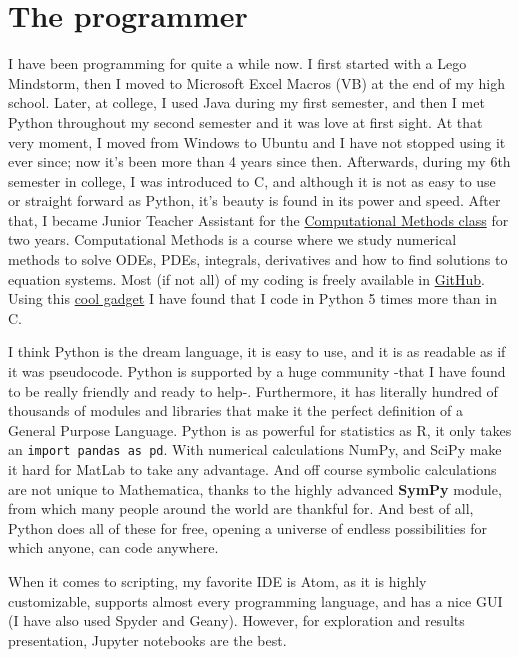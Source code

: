 \documentclass[12pt]{article}
\newcommand{\sympy}{\textbf{SymPy}}
\begin{document}
\section{The programmer}
I have been programming for quite a while now. I first started with a Lego Mindstorm, then I moved to Microsoft Excel Macros (VB) at the end of my high school. Later, at college, I used Java during my first semester, and then I met Python throughout my second semester and it was love at first sight. At that very moment, I moved from Windows to Ubuntu and I have not stopped using it ever since; now it's been more than 4 years since then. Afterwards, during my 6th semester in college, I was introduced to C, and although it is not as easy to use or straight forward as Python, it's beauty is found in its power and speed. After that, I became Junior Teacher Assistant for the \href{https://github.com/ComputoCienciasUniandes/MetodosComputacionales}{Computational Methods class} for two years. Computational Methods is a course where we study numerical methods to solve ODEs, PDEs, integrals, derivatives and how to find solutions to equation systems. Most (if not all) of my coding is freely available in \href{http://www.github.com/jsbarbosa}{GitHub}. Using this \href{http://ionicabizau.github.io/github-profile-languages/?user=\%2540jsbarbosa}{cool gadget} I have found that I code in Python 5 times more than in C.

I think Python is the dream language, it is easy to use, and it is as readable as if it was pseudocode. Python is supported by a huge community -that I have found to be really friendly and ready to help-. Furthermore, it has literally hundred of thousands of modules and libraries that make it the perfect definition of a General Purpose Language. Python is as powerful for statistics as R, it only takes an \texttt{import pandas as pd}. With numerical calculations NumPy, and SciPy make it hard for MatLab to take any advantage. And off course symbolic calculations are not unique to Mathematica, thanks to the highly advanced \sympy{} module, from which many people around the world are thankful for. And best of all, Python does all of these for free, opening a universe of endless possibilities for which anyone, can code anywhere.

When it comes to scripting, my favorite IDE is Atom, as it is highly customizable, supports almost every programming language, and has a nice GUI (I have also used Spyder and Geany). However, for exploration and results presentation, Jupyter notebooks are the best.
\end{document}
